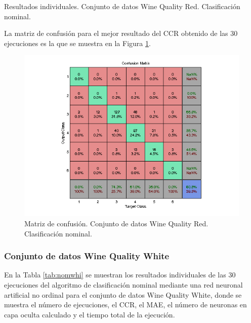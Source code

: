 			\begin{table}[!htbp]
				\centering
				\caption{Resultados individuales. Conjunto de datos Wine Quality Red. Clasificación nominal.}
				\label{tab:nomred}
			\end{table}
			
			La matriz de confusión para el mejor resultado del CCR obtenido de las 30 ejecuciones es la que se muestra en la Figura \ref{fig:nomred}.
			
			\begin{figure}[htbp]
				\centering
				\includegraphics[scale=0.8]{../src/results/nominal/winequality-red_mc1.png}
				\caption{Matriz de confusión. Conjunto de datos Wine Quality Red. Clasificación nominal.}
				\label{fig:nomred}
			\end{figure}

			\subsubsection{Conjunto de datos Wine Quality White}
			
			En la Tabla \ref{tab:nomwhi} se muestran los resultados individuales de las 30 ejecuciones del algoritmo de clasificación nominal mediante una red neuronal artificial no ordinal para el conjunto de datos Wine Quality White, donde se muestra el número de ejecuciones, el CCR, el MAE, el número de neuronas en capa oculta calculado y el tiempo total de la ejecución.\\
			
